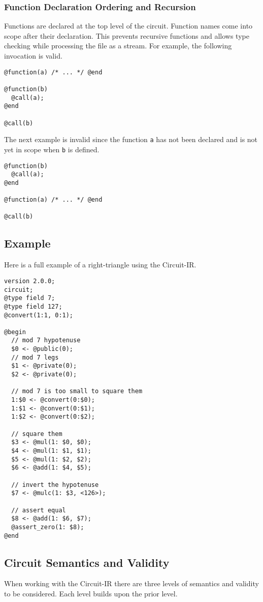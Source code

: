 \subsubsection{Function Declaration Ordering and Recursion}
Functions are declared at the top level of the circuit.
Function names come into scope after their declaration.
This prevents recursive functions and allows type checking while processing the file as a stream.
%
For example, the following invocation is valid.
\begin{lstlisting}[language=ir]
@function(a) /* ... */ @end

@function(b)
  @call(a);
@end

@call(b)
\end{lstlisting}
The next example is invalid since the function \texttt{a} has not been declared and is not yet in scope when \texttt{b} is defined.
\begin{lstlisting}[language=ir]
@function(b)
  @call(a);
@end

@function(a) /* ... */ @end

@call(b)
\end{lstlisting}

\subsection{Example}\label{sec:circuitir_example}
Here is a full example of a right-triangle using the Circuit-IR.
%
\begin{lstlisting}[language=ir]
version 2.0.0;
circuit;
@type field 7;
@type field 127;
@convert(1:1, 0:1);

@begin
  // mod 7 hypotenuse
  $0 <- @public(0);
  // mod 7 legs
  $1 <- @private(0);
  $2 <- @private(0);

  // mod 7 is too small to square them
  1:$0 <- @convert(0:$0);
  1:$1 <- @convert(0:$1);
  1:$2 <- @convert(0:$2);

  // square them
  $3 <- @mul(1: $0, $0);
  $4 <- @mul(1: $1, $1);
  $5 <- @mul(1: $2, $2);
  $6 <- @add(1: $4, $5);

  // invert the hypotenuse
  $7 <- @mulc(1: $3, <126>);

  // assert equal
  $8 <- @add(1: $6, $7);
  @assert_zero(1: $8);
@end
\end{lstlisting}

\subsection{Circuit Semantics and Validity}\label{circuit_ir_validity}
When working with the Circuit-IR there are three levels of semantics and validity to be considered.
Each level builds upon the prior level.

